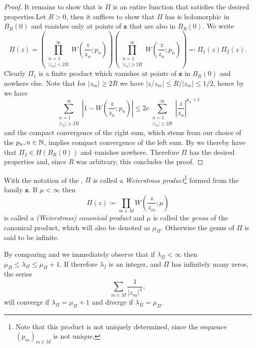\begin{proof}
    It remains to show that is $\Pi$ is an entire function that satisfies the desired properties.Let $R > 0$, then it suffices to show that $\Pi$ has is holomorphic in $B_R(0)$ and vanishes only at points of $\mathbf{z}$ that are also in $B_R(0)$. We write
    $$ \Pi(z) = \left( \prod_{\substack{n=1 \\ \vert z_n \vert < 2R }}^\infty W\left(\frac{z}{z_n}; p_n\right) \right) \left( \prod_{\substack{n=1 \\ \vert z_n \vert \geq 2R }}^\infty W\left(\frac{z}{z_n}; p_n\right) \right) \eqqcolon \Pi_1(z) \Pi_2(z). $$
    Clearly $\Pi_1$ is a finite product which vanishes at points of $\mathbf{z}$ in $B_R(0)$ and nowhere else. Note that for $\vert z_m \vert \geq 2R$ we have $\vert z / z_m \vert \leq R / \vert z_m \vert \leq 1 / 2$, hence by  we have
    $$ \sum_{\substack{n=1 \\ \vert z_n \vert \geq 2R }}^\infty \left\vert 1 - W\left(\frac{z}{z_n}; p_n\right) \right\vert \leq 2e \sum_{\substack{n=1 \\ \vert z_n \vert \geq 2R }}^\infty \left\vert \frac{z}{z_n} \right\vert^{p_n + 1} $$
    and the compact convergence of the right sum, which stems from our choice of the $p_n, n \in \mathbb{N}$, implies compact convergence of the left sum. By  we thereby have that $\Pi_2 \in H(B_R(0))$ and vanishes nowhere. Therefore $\Pi$ has the desired properties and, since $R$ was arbitrary, this concludes the proof.
\end{proof}

\begin{definition} \label{def:canonical-product}
    With the notation of the , $\Pi$ is called a \emph{Weierstrass product}\footnote{Note that this product is not uniquely determined, since the sequence $(p_m)_{m \in M}$ is not unique.} formed from the family $\mathbf{z}$. If $\mu < \infty$ then
    \begin{equation}
        \Pi(z) \coloneqq \prod_{m \in M} W\left(\frac{z}{z_m}; \mu \right)
    \end{equation}
    is called a \emph{(Weierstrass) canonical product} and $\mu$ is called the \emph{genus} of the canonical product, which will also be denoted as $\mu_\Pi$. Otherwise the genus of $\Pi$ is said to be infinite.
\end{definition}

\begin{remark}
    By comparing  and  we immediately observe that if $\lambda_\Pi < \infty$ then $\mu_\Pi \leq \lambda_\Pi \leq \mu_\Pi + 1$. If therefore $\lambda_f$ is an integer, and $\Pi$ has infinitely many zeros, the series
    $$ \sum_{m \in M} \frac{1}{\vert z_m \vert^{\lambda}}, $$
    will converge if $\lambda_\Pi = \mu_\Pi + 1$ and diverge if $\lambda_\Pi = \mu_\Pi$.
\end{remark}

